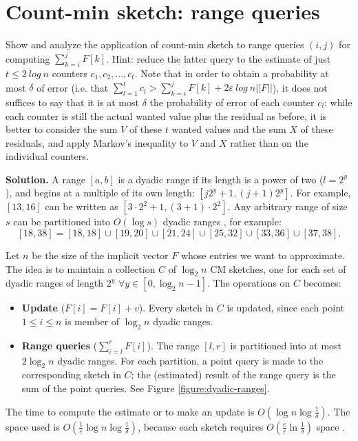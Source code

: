 \section{Count-min sketch: range queries}

Show and analyze the application of count-min sketch to range queries $(i,j)$ for computing  $\sum^j_{k=i} F[k]$. Hint: reduce the latter query to the estimate of just $t \leq 2\ log\ n$ counters $c_1,c_2,...,c_t$. Note that in order to obtain a probability at most $\delta$ of error (i.e. that $\sum^t_{l=1}c_l > \sum^j_{k=i}F[k] + 2\varepsilon\ log\ n ||F||$), it does not suffices to say that it is at most $\delta$ the probability of error of each counter $c_l$: while each counter is still the actual wanted value plus the residual as before, it is better to consider the sum $V$ of these $t$ wanted values and the sum $X$ of these residuals, and apply Markov’s inequality to $V$ and $X$ rather than on the individual counters.

\vspace{1cm}
\noindent
\textbf{Solution.} A range $[a,b]$ is a dyadic range if its length is a power of two ($l=2^y$), and begins at a multiple of its own length: $[j2^y+1, (j+1)2^y]$. For example, $[13,16]$ can be written as $[3\cdot 2^2+1,(3+1)\cdot 2^2]$. Any arbitrary range of size $s$ can be partitioned into $O(\log s)$ dyadic ranges \cite{Cormode11}, for example:
$$[18,38]=[18,18]\cup[19,20]\cup[21,24]\cup[25,32]\cup[33,36]\cup[37,38].$$

Let $n$ be the size of the implicit vector $F$ whose entries we want to approximate. The idea is to maintain a collection $C$ of $\log_2 n$ CM sketches, one for each set of dyadic ranges of length $2^y$ $\forall y\in [0, \log_2 n-1]$. The operations on $C$ becomes:
\begin{itemize}
  \item \textbf{Update} ($F[i] = F[i] + v$). Every sketch in $C$ is updated, since each point $1 \leq i \leq n$ is member of $\log_2 n$ dyadic ranges.
  \item \textbf{Range queries} ($\sum_{i=l}^rF[i]$). The range $[l,r]$ is partitioned into at most $2\log_2 n$ dyadic ranges. For each partition, a point query is made to the corresponding sketch in $C$; the (estimated) result of the range query is the sum of the point queries. See Figure \ref{figure:dyadic-ranges}.
\end{itemize}

The time to compute the estimate or to make an update is $O(\log n\log\frac{1}{\delta})$. The space used is $O(\frac{1}{\varepsilon}\log n\log\frac{1}{\delta})$, because each sketch requires $O(\frac{e}{\varepsilon}\ln\frac{1}{\delta})$ space \cite{Cormode05}.

